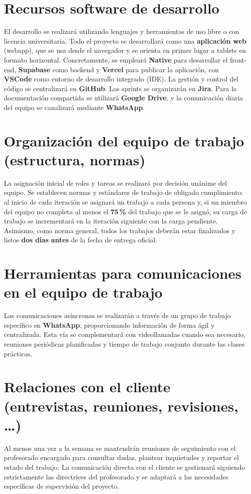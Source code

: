 \documentclass[11pt,a4paper]{article}
\newcommand{\key}[1]{\textbf{\color{brandblue}#1}}
\begin{document}
\section{Recursos software de desarrollo}
El desarrollo se realizará utilizando lenguajes y herramientas de uso libre o con licencia universitaria. Todo el proyecto se desarrollará como una \key{aplicación web} (webapp), que se usa desde el navegador y se orienta en primer lugar a tablets en formato horizontal. Concretamente, se empleará \key{Native} para desarrollar el front-end, \key{Supabase} como backend y \key{Vercel} para publicar la aplicación, con \key{VSCode} como entorno de desarrollo integrado (IDE). La gestión y control del código se centralizará en \key{GitHub}. Los sprints se organizarán en \key{Jira}. Para la documentación compartida se utilizará \key{Google Drive}, y la comunicación diaria del equipo se canalizará mediante \key{WhatsApp}.

\section{Organización del equipo de trabajo (estructura, normas)}
La asignación inicial de roles y tareas se realizará por decisión unánime del equipo. Se establecen normas y estándares de trabajo de obligado cumplimiento: al inicio de cada iteración se asignará un trabajo a cada persona y, si un miembro del equipo no completa al menos el \key{75\,\%} del trabajo que se le asignó, su carga de trabajo se incrementará en la iteración siguiente con la carga pendiente. Asimismo, como norma general, todos los trabajos deberán estar finalizados y listos \key{dos días antes} de la fecha de entrega oficial.

\section{Herramientas para comunicaciones en el equipo de trabajo}
Las comunicaciones asíncronas se realizarán a través de un grupo de trabajo específico en \key{WhatsApp}, proporcionando información de forma ágil y centralizada. Esta vía se complementará con videollamadas cuando sea necesario, reuniones periódicas planificadas y tiempo de trabajo conjunto durante las clases prácticas.

\section{Relaciones con el cliente (entrevistas, reuniones, revisiones, \ldots)}
Al menos una vez a la semana se mantendrán reuniones de seguimiento con el profesorado encargado para consultar dudas, plantear inquietudes y reportar el estado del trabajo. La comunicación directa con el cliente se gestionará siguiendo estrictamente las directrices del profesorado y se adaptará a las necesidades específicas de supervisión del proyecto.
\end{document}
